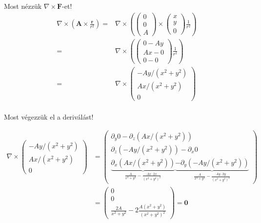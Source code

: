 \documentclass[12pt,a4paper]{scrartcl}
\let\mathbf\bm
\begin{document}
Most nézzük $\nabla  \times {\mathbf{F}}$-et! 
\[\begin{aligned}
  \nabla  \times \left( {{\mathbf{A}} \times \frac{{\mathbf{r}}}{{{r^2}}}} \right) =  & \nabla  \times \left( {\left( {\begin{array}{*{20}{c}}
  0 \\ 
  0 \\ 
  A 
\end{array}} \right) \times \left( {\begin{array}{*{20}{c}}
  x \\ 
  y \\ 
  0 
\end{array}} \right)\frac{1}{{{r^2}}}} \right) \\ 
   =  & \nabla  \times \left( {\left( {\begin{array}{*{20}{c}}
  {0 - Ay} \\ 
  {Ax - 0} \\ 
  {0 - 0} 
\end{array}} \right)\frac{1}{{{r^2}}}} \right) \\ 
   =  & \nabla  \times \left( {\begin{array}{*{20}{c}}
  { - Ay/\left( {{x^2} + {y^2}} \right)} \\ 
  {Ax/\left( {{x^2} + {y^2}} \right)} \\ 
  0 
\end{array}} \right) \\ 
\end{aligned} \]

Most végezzük el a deriválást!

\[\begin{aligned}
  \nabla  \times \left( {\begin{array}{*{20}{c}}
  { - Ay/\left( {{x^2} + {y^2}} \right)} \\ 
  {Ax/\left( {{x^2} + {y^2}} \right)} \\ 
  0 
\end{array}} \right) &  = \left( {\begin{array}{*{20}{c}}
  {{\partial _y}0 - {\partial _z}\left( {Ax/\left( {{x^2} + {y^2}} \right)} \right)} \\ 
  {{\partial _z}\left( { - Ay/\left( {{x^2} + {y^2}} \right)} \right) - {\partial _x}0} \\ 
  {\underbrace {{\partial _x}\left( {Ax/\left( {{x^2} + {y^2}} \right)} \right)}_{\frac{A}{{{x^2} + {y^2}}} - \frac{{Ax \cdot 2x}}{{{{\left( {{x^2} + {y^2}} \right)}^2}}}}\underbrace { - {\partial _y}\left( { - Ay/\left( {{x^2} + {y^2}} \right)} \right)}_{\frac{A}{{{x^2} + {y^2}}} - \frac{{Ay \cdot 2y}}{{{{\left( {{x^2} + {y^2}} \right)}^2}}}}} 
\end{array}} \right) \\ 
   &  = \left( {\begin{array}{*{20}{c}}
  0 \\ 
  0 \\ 
  {\frac{{2A}}{{{x^2} + {y^2}}} - 2\frac{{A\left( {{x^2} + {y^2}} \right)}}{{{{\left( {{x^2} + {y^2}} \right)}^2}}}} 
\end{array}} \right) = {\mathbf{0}} \\ 
\end{aligned} \]
\end{document}
